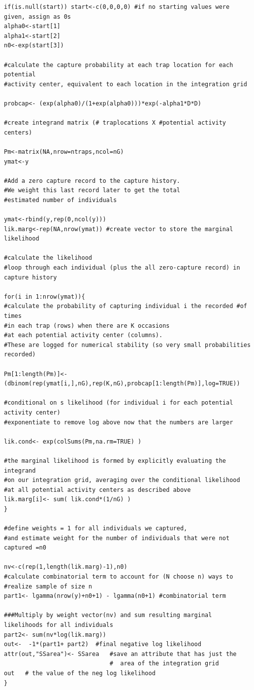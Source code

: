 \documentclass[12pt]{article}
\begin{document}
\begin{spacing}{1.2}
{\begin{verbatim}
if(is.null(start)) start<-c(0,0,0,0) #if no starting values were given, assign as 0s
alpha0<-start[1]
alpha1<-start[2]
n0<-exp(start[3])

#calculate the capture probability at each trap location for each potential 
#activity center, equivalent to each location in the integration grid

probcap<- (exp(alpha0)/(1+exp(alpha0)))*exp(-alpha1*D*D) 

#create integrand matrix (# traplocations X #potential activity centers)

Pm<-matrix(NA,nrow=ntraps,ncol=nG) 
ymat<-y

#Add a zero capture record to the capture history. 
#We weight this last record later to get the total
#estimated number of individuals

ymat<-rbind(y,rep(0,ncol(y)))  
lik.marg<-rep(NA,nrow(ymat)) #create vector to store the marginal likelihood

#calculate the likelihood  
#loop through each individual (plus the all zero-capture record) in capture history

for(i in 1:nrow(ymat)){ 
#calculate the probability of capturing individual i the recorded #of times 
#in each trap (rows) when there are K occasions 
#at each potential activity center (columns).
#These are logged for numerical stability (so very small probabilities recorded)

Pm[1:length(Pm)]<- (dbinom(rep(ymat[i,],nG),rep(K,nG),probcap[1:length(Pm)],log=TRUE))

#conditional on s likelihood (for individual i for each potential activity center)
#exponentiate to remove log above now that the numbers are larger

lik.cond<- exp(colSums(Pm,na.rm=TRUE) )

#the marginal likelihood is formed by explicitly evaluating the integrand 
#on our integration grid, averaging over the conditional likelihood 
#at all potential activity centers as described above
lik.marg[i]<- sum( lik.cond*(1/nG) )  
}      

#define weights = 1 for all individuals we captured, 
#and estimate weight for the number of individuals that were not captured =n0                 
                     
nv<-c(rep(1,length(lik.marg)-1),n0)  
#calculate combinatorial term to account for (N choose n) ways to  
#realize sample of size n
part1<- lgamma(nrow(y)+n0+1) - lgamma(n0+1) #combinatorial term  

###Multiply by weight vector(nv) and sum resulting marginal likelihoods for all individuals
part2<- sum(nv*log(lik.marg))  
out<-  -1*(part1+ part2)  #final negative log likelihood
attr(out,"SSarea")<- SSarea   #save an attribute that has just the
                              #  area of the integration grid
out   # the value of the neg log likelihood
}
\end{verbatim}
}




\end{spacing}
\end{document}
